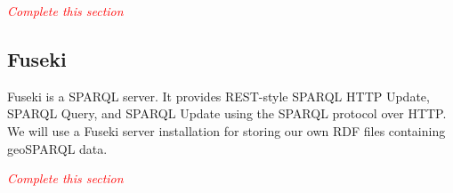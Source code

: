 \emph{\textcolor{red}{Complete this section}}


\subsection{Fuseki}

Fuseki is a SPARQL server. It provides REST-style SPARQL HTTP Update, SPARQL Query, and SPARQL Update using the SPARQL protocol over HTTP. We will use a Fuseki server installation for storing our own RDF files containing geoSPARQL data.

\emph{\textcolor{red}{Complete this section}}

